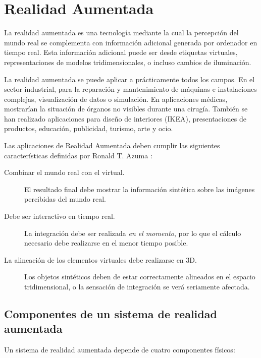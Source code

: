 \section{Realidad Aumentada}
La realidad aumentada es una tecnología mediante la cual la percepción del mundo real se complementa con información adicional generada por ordenador en tiempo real. Esta información adicional puede ser desde etiquetas virtuales, representaciones de modelos tridimensionales, o incluso cambios de iluminación. 


La realidad aumentada se puede aplicar a prácticamente todos los campos. En el sector industrial, para la reparación y mantenimiento de máquinas e instalaciones complejas, visualización de datos o simulación.  En aplicaciones médicas, mostrarían la situación de órganos no visibles durante una cirugía. También se han realizado aplicaciones para diseño de interiores (IKEA), presentaciones de productos, educación, publicidad, turismo, arte y ocio. 


Las aplicaciones de Realidad Aumentada deben cumplir las siguientes características definidas por Ronald T. Azuma \cite{Azuma}:

\begin{description}
\item[Combinar el mundo real con el virtual.] El resultado final debe mostrar la información sintética sobre las imágenes percibidas del mundo real.
\item[Debe ser interactivo en tiempo real.] La integración debe ser realizada \emph{en el momento}, por lo que el cálculo necesario debe realizarse en el menor tiempo posible.
\item[La alineación de los elementos virtuales debe realizarse en 3D.] Los objetos sintéticos deben de estar correctamente alineados en el espacio tridimensional,  o la sensación de integración se verá seriamente afectada.
\end{description}
 
\subsection{Componentes de un sistema de realidad aumentada}
Un sistema de realidad aumentada depende de cuatro componentes físicos:

